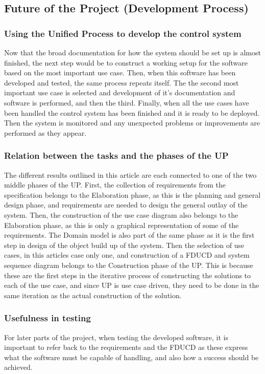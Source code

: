 \documentclass[11pt, A4paper, english]{article}
\begin{document}
		\subsection{Future of the Project (Development Process)}
			\subsubsection{Using the Unified Process to develop the control system}
Now that the broad documentation for how the system should be set up is almost finished, the next step would be to construct a working setup for the software based on the most important use case. Then, when this software has been developed and tested, the same process repeats itself. The the second most important use case is selected and development of it's documentation and software is performed, and then the third. Finally, when all the use cases have been handled the control system has been finished and it is ready to be deployed. Then the system is monitored and any unexpected problems or improvements are performed as they appear.
			
			\subsubsection{Relation between the tasks and the phases of the UP}
The different results outlined in this article are each connected to one of the two middle phases of the UP. First, the collection of requirements from the specification belongs to the Elaboration phase, as this is the planning and general design phase, and requirements are needed to design the general outlay of the system. Then, the construction of the use case diagram also belongs to the Elaboration phase, as this is only a graphical representation of some of the requirements. The Domain model is also part of the same phase as it is the first step in design of the object build up of the system. Then the selection of use cases, in this articles case only one, and construction of a FDUCD and system sequence diagram belongs to the Construction phase of the UP. This is because these are the first steps in the iterative process of constructing the solutions to each of the use case, and since UP is use case driven, they need to be done in the same iteration as the actual construction of the solution.
			
			\subsubsection{Usefulness in testing}
For later parts of the project, when testing the developed software, it is important to refer back to the requirements and the FDUCD as these express what the software must be capable of handling, and also how a success should be achieved.
\end{document}
